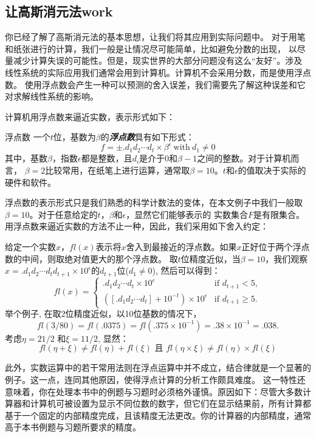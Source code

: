 \subsection{让高斯消元法work}

你已经了解了高斯消元法的基本思想，让我们将其应用到实际问题中。
对于用笔和纸张进行的计算，我们一般是让情况尽可能简单，比如避免分数的出现，
以尽量减少计算失误的可能性。但是，现实世界的大部分问题没有这么“友好”。涉及
线性系统的实际应用我们通常会用到计算机。计算机不会采用分数，而是使用浮点数。
使用浮点数会产生一种可以预测的舍入误差，我们需要先了解这种误差和它对求解线性系统的影响。

计算机用浮点数来逼近实数，表示形式如下：

\begin{bluebox}{浮点数}
    一个$t$位，基数为$\beta$的\textit{\textbf{浮点数}}具有如下形式：
    $$f = \pm .d_{1} d_{2} \cdots d_{t} \times \beta^{\epsilon} \ \text{with} \ d_{1} \neq 0$$
    其中，基数$\beta$，指数$\epsilon$都是整数，且$d_{i}$是介于$0$和$\beta - 1$之间的整数。对于计算机而言，
    $\beta=2$比较常用，在纸笔上进行运算，通常取$\beta=10$。$t$和$\epsilon$的值取决于实际的硬件和软件。
\end{bluebox}

浮点数的表示形式只是我们熟悉的科学计数法的变体，在本文例子中我们一般取$\beta=10$。对于任意给定的$t$，$\beta$和$\epsilon$，显然它们能够表示的
实数集合$F$是有限集合。用浮点数来逼近实数的方法不止一种，因此，我们采用如下舍入约定：

给定一个实数$x$，$fl(x)$表示将$x$舍入到最接近的浮点数。如果$x$正好位于两个浮点数的中间，则取绝对值更大的那个浮点数。
取$t$位精度近似，当$\beta=10$，我们观察$x=.d_1d_2\cdots d_td_{t+1} \times 10^{\epsilon}$的$d_{t+1}$位($d_1\neq0$),
然后可以得到：
$$fl(x) = \begin{cases} .d_1d_2\cdots d_t \times 10^\epsilon & \text{if } d_{t+1} < 5, \\ ([.d_1d_2\cdots d_t] + 10^{-t}) \times 10^\epsilon & \text{if } d_{t+1} \ge 5. \end{cases}$$
举个例子, 在取$2$位精度近似，以10位基数的情况下，
$$fl(3/80) = fl(.0375) = fl(.375 \times 10^{-1}) = .38 \times 10^{-1} = .038.$$
考虑$\eta = 21/2$ 和$\xi =11/2$, 显然：
$$fl(\eta + \xi) \neq fl(\eta) + fl(\xi) \text{ 且\ } fl(\eta \times \xi) \neq fl(\eta) \times fl(\xi)$$

此外，实数运算中的若干常用法则在浮点运算中并不成立，结合律就是一个显著的例子。这一点，连同其他原因，使得浮点计算的分析工作颇具难度。
这一特性还意味着，你在处理本书中的例题与习题时必须格外谨慎。原因如下：尽管大多数计算器和计算机可被设置为显示不同位数的数字，但它们在显示结果前，所有计算都基于一个固定的内部精度完成，且该精度无法更改。你的计算器的内部精度，通常高于本书例题与习题所要求的精度。

